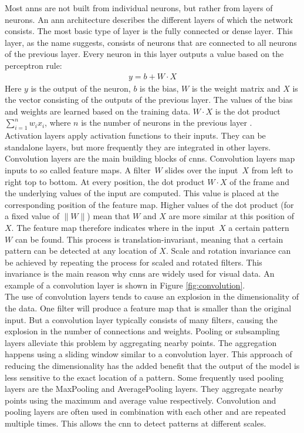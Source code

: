Most \glspl{ann} are not built from individual neurons, but rather from layers of neurons. An \gls{ann} architecture describes the different layers of which the network consists. The most basic type of layer is the fully connected or dense layer. This layer, as the name suggests, consists of neurons that are connected to all neurons of the previous layer. Every neuron in this layer outputs a value based on the perceptron rule:
\begin{align*}
	y = b + W \cdot X
\end{align*} 
Here $y$ is the output of the neuron, $b$ is the bias, $W$ is the weight matrix and $X$ is the vector consisting of the outputs of the previous layer. The values of the bias and weights are learned based on the training data. $W \cdot X$ is the dot product $\sum_{i=1}^nw_ix_i$, where $n$ is the number of neurons in the previous layer \cite{perceptron_wikipedia}.\\

Activation layers apply activation functions to their inputs. They can be standalone layers, but more frequently they are integrated in other layers.\\ 

Convolution layers \cite{mnist} are the main building blocks of \glspl{cnn}. Convolution layers map inputs to so called feature maps. A filter~$W$ slides over the input~$X$ from left to right top to bottom. At every position, the dot product $W\cdot X$ of the frame and the underlying values of the input are computed. This value is placed at the corresponding position of the feature map. Higher values of the dot product (for a fixed value of $\|W\|$) mean that $W$ and $X$ are more similar at this position of $X$. The feature map therefore indicates where in the input~$X$ a certain pattern~$W$ can be found. This process is translation-invariant, meaning that a certain pattern can be detected at any location of $X$. Scale and rotation invariance can be achieved by repeating the process for scaled and rotated filters. This invariance is the main reason why \glspl{cnn} are widely used for visual data. An example of a convolution layer is shown in Figure \ref{fig:convolution}.\\

The use of convolution layers tends to cause an explosion in the dimensionality of the data. One filter will produce a feature map that is smaller than the original input. But a convolution layer typically consists of many filters, causing the explosion in the number of connections and weights. Pooling or subsampling layers \cite{mnist} alleviate this problem by aggregating nearby points. The aggregation happens using a sliding window similar to a convolution layer. This approach of reducing the dimensionality has the added benefit that the output of the model is less sensitive to the exact location of a pattern. Some frequently used pooling layers are the MaxPooling and AveragePooling layers. They aggregate nearby points using the maximum and average value respectively. Convolution and pooling layers are often used in combination with each other and are repeated multiple times. This allows the \gls{cnn} to detect patterns at different scales.\\
 
